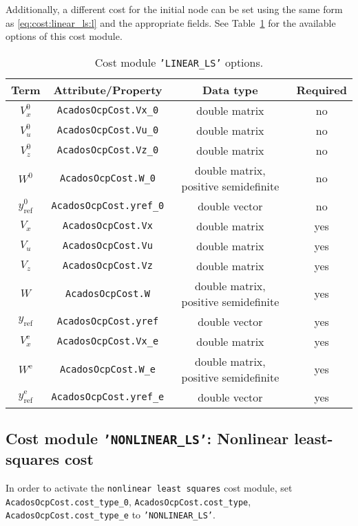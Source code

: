 \documentclass[english]{article}
\newcommand{\code}[1]{\texttt{#1}}
\newcommand{\ind}[1]{_{\textrm{#1}}}
\newcommand{\terminal}{^{\textrm{e}}}
\newcommand{\initial}{^{\textrm{0}}}
\newcommand{\mandatory}{yes}
\newcommand{\optional}{no}
\begin{document}
Additionally, a different cost for the initial node can be set using the same form as \eqref{eq:cost:linear_ls:l} and the appropriate fields.
See Table~\ref{tab:cost:linear_ls} for the available options of this cost module.
%
\begin{table}[ht!]
    \centering
    \begin{tabular}{cccc}
        \toprule
        Term & Attribute/Property & Data type & Required \\ \midrule
        $ V_x\initial $ & \code{AcadosOcpCost.Vx\_0}    & double matrix & \optional   \\
        $ V_u\initial $ & \code{AcadosOcpCost.Vu\_0}    & double matrix & \optional   \\
        $ V_z\initial $ & \code{AcadosOcpCost.Vz\_0}    & double matrix & \optional  \\
        $ W\initial $ & \code{AcadosOcpCost.W\_0}    & double matrix, positive semidefinite & \optional  \\
        $ y\ind{ref}\initial $ & \code{AcadosOcpCost.yref\_0}    & double vector & \optional   \\ [1em]
        $ V_x $ & \code{AcadosOcpCost.Vx}    & double matrix& \mandatory   \\
        $ V_u $ & \code{AcadosOcpCost.Vu}    & double matrix & \mandatory   \\
        $ V_z $ & \code{AcadosOcpCost.Vz}    & double matrix & \mandatory  \\
        $ W $ & \code{AcadosOcpCost.W}    & double matrix, positive semidefinite & \mandatory  \\
        $ y\ind{ref} $ & \code{AcadosOcpCost.yref}    & double vector & \mandatory   \\ [1em]
        $ V_x\terminal $ & \code{AcadosOcpCost.Vx\_e}    & double matrix & \mandatory  \\
        $ W\terminal $ & \code{AcadosOcpCost.W\_e}    & double matrix, positive semidefinite & \mandatory   \\
        $ y\ind{ref}\terminal $ & \code{AcadosOcpCost.yref\_e}   & double vector & \mandatory   \\
        \bottomrule
    \end{tabular}
\caption{Cost module \code{'LINEAR\_LS'} options.} \label{tab:cost:linear_ls}
\end{table}
%
\subsection{Cost module \code{'NONLINEAR\_LS'}: Nonlinear least-squares cost}\label{sec:cost:nonlinear_ls}
%
In order to activate the \code{nonlinear least squares} cost module, set \code{AcadosOcpCost.cost\_type\_0}, \code{AcadosOcpCost.cost\_type}, \code{AcadosOcpCost.cost\_type\_e} to \code{'NONLINEAR\_LS'}.
\end{document}
